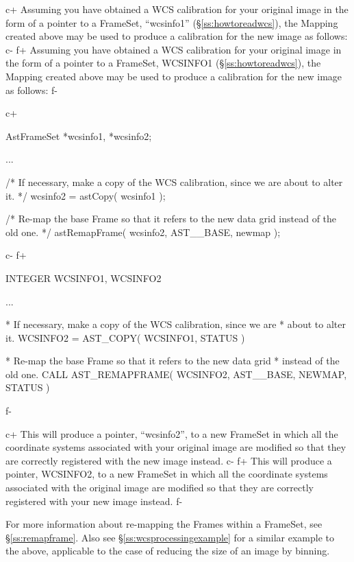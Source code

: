\documentclass[twoside,11pt]{starlink}
\providecommand{\secref}[1]{\S\ref{#1}}
\begin{document}
c+
Assuming you have obtained a WCS calibration for your original image
in the form of a pointer to a FrameSet, ``wcsinfo1''
(\secref{ss:howtoreadwcs}), the Mapping created above may be used to
produce a calibration for the new image as follows:
c-
f+
Assuming you have obtained a WCS calibration for your original image
in the form of a pointer to a FrameSet, WCSINFO1
(\secref{ss:howtoreadwcs}), the Mapping created above may be used to
produce a calibration for the new image as follows:
f-

c+
\begin{small}
\begin{terminalv}
AstFrameSet *wcsinfo1, *wcsinfo2;

...

/* If necessary, make a copy of the WCS calibration, since we are
   about to alter it. */
wcsinfo2 = astCopy( wcsinfo1 );

/* Re-map the base Frame so that it refers to the new data grid
   instead of the old one. */
astRemapFrame( wcsinfo2, AST__BASE, newmap );
\end{terminalv}
\end{small}
c-
f+
\begin{small}
\begin{terminalv}
      INTEGER WCSINFO1, WCSINFO2

      ...

*  If necessary, make a copy of the WCS calibration, since we are
*  about to alter it.
      WCSINFO2 = AST_COPY( WCSINFO1, STATUS )

*  Re-map the base Frame so that it refers to the new data grid
*  instead of the old one.
      CALL AST_REMAPFRAME( WCSINFO2, AST__BASE, NEWMAP, STATUS )
\end{terminalv}
\end{small}
f-

c+
This will produce a pointer, ``wcsinfo2'', to a new FrameSet in which
all the coordinate systems associated with your original image are
modified so that they are correctly registered with the new image
instead.
c-
f+
This will produce a pointer, WCSINFO2, to a new FrameSet in which all
the coordinate systems associated with the original image are modified
so that they are correctly registered with your new image instead.
f-

For more information about re-mapping the Frames within a FrameSet,
see \secref{ss:remapframe}. Also see \secref{ss:wcsprocessingexample}
for a similar example to the above, applicable to the case of reducing
the size of an image by binning.
\end{document}

